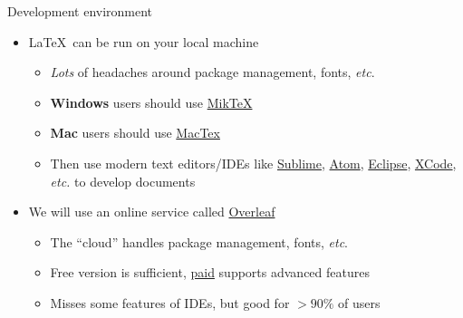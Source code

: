 \documentclass{cubeamer}
\begin{document}
\begin{frame}{Development environment}
    \begin{itemize}
        \item \LaTeX~can be run on your local machine
        \begin{itemize}
            \item \textit{Lots} of headaches around package management, fonts, \textit{etc}.
            \item \textbf{Windows} users should use \href{https://miktex.org/}{MikTeX}
            \item \textbf{Mac} users should use \href{https://www.tug.org/mactex/}{MacTex}
            \item Then use modern text editors/IDEs like \href{https://www.sublimetext.com/}{Sublime}, \href{https://atom.io/}{Atom}, \href{https://www.eclipse.org/ide/}{Eclipse}, \href{https://developer.apple.com/xcode/}{XCode}, \textit{etc.} to develop documents
        \end{itemize}
        \item We will use an online service called \href{https://www.overleaf.com}{Overleaf}
        \begin{itemize}
            \item The ``cloud'' handles package management, fonts, \textit{etc}.
            \item Free version is sufficient, \href{https://www.overleaf.com/user/subscription/plans}{paid} supports advanced features
            \item Misses some features of IDEs, but good for $>90\%$ of users
        \end{itemize}
    \end{itemize}
\end{frame}
\end{document}
